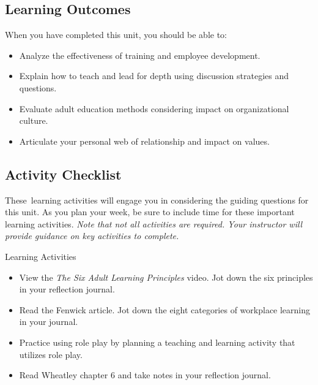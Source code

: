 \documentclass[
]{book}
\providecommand{\tightlist}{%
  \setlength{\itemsep}{0pt}\setlength{\parskip}{0pt}}
\begin{document}
\hypertarget{learning-outcomes-7}{%
\subsection*{Learning Outcomes}\label{learning-outcomes-7}}

When you have completed this unit, you should be able to:

\begin{itemize}
\tightlist
\item
  Analyze the effectiveness of training and employee development.\\
\item
  Explain how to teach and lead for depth using discussion strategies and questions.\\
\item
  Evaluate adult education methods considering impact on organizational culture.\\
\item
  Articulate your personal web of relationship and impact on values.
\end{itemize}

\hypertarget{activity-checklist-7}{%
\subsection*{Activity Checklist}\label{activity-checklist-7}}

These~learning activities will engage you in considering the guiding questions for this unit. As you plan your week, be sure to include time for these important learning activities. \emph{Note that not all activities are required. Your instructor will provide guidance on key activities to complete.}

\begin{reflect}
{Learning Activities}

\begin{itemize}
\tightlist
\item
  View the \emph{The Six Adult Learning Principles} video. Jot down the six principles in your reflection journal.\\
\item
  Read the Fenwick article. Jot down the eight categories of workplace learning in your journal.\\
\item
  Practice using role play by planning a teaching and learning activity that utilizes role play.\\
\item
  Read Wheatley chapter 6 and take notes in your reflection journal.
\end{itemize}
\end{reflect}
\end{document}
